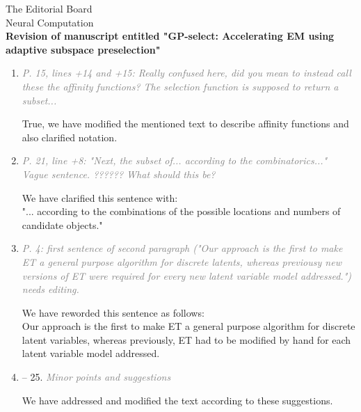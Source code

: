 \documentclass[10pt]{letter}
\newcommand{\rvr}[1]{\textcolor{gray}{#1}}
\newcommand{\pr}{\mathrm{pr}}%
\begin{document}
\begin{letter}{
The Editorial Board\\
Neural Computation\\
\vspace{10mm}
\textbf{Revision of manuscript entitled "GP-select: Accelerating EM using adaptive
subspace preselection"}
}
\begin{enumerate}[topsep=3pt,itemsep=2ex,partopsep=1ex,parsep=1ex]
    Model \textbf{C}. \textit{Nonlinear Spike-and-slab sparse coding}:
    \begin{align}
&\hat{W}_{hd}   = \frac{\langle s_h y_d \rangle^*}{\langle s_d^2 \rangle^*}\ 
\text{\quad}
&\hat{\sigma}^2 = \left\langle W_{dh} s_h - y_d^{(n)}\right\rangle^\ast \nonumber\\
%
&\hat{\pi} = \langle \delta(s) \rangle  \text{\quad}\text{\quad}\text{\quad}\nonumber\\
%
&\hat{\mu}_{\pr} = \langle s_h \rangle^* 
 \text{\quad}\text{\quad}\text{\quad}\text{\quad}\text{\quad}\text{\quad}\text{\quad} 
&\hat{\sigma}^2_{\pr} = \langle (s_h - \hat{\mu}_{\pr})^2 \rangle^* \nonumber
%
\end{align}


    \item \rvr{\emph{P. 15, lines +14 and +15: Really confused here, did you mean to instead call these the affinity functions? The selection function is supposed to return a subset...}}

    True, we have modified the mentioned text to describe affinity functions and also clarified notation. 


    \item \rvr{\emph{P. 21, line +8: "Next, the subset of... according to the combinatorics..." Vague sentence. ??????  What should this be?}}

We have clarified this sentence with:\\
"... according to the combinations of the possible locations and numbers of candidate objects."

    
    \item \rvr{\emph{ P. 4: first sentence of second paragraph ("Our approach is the first to make ET a general purpose algorithm for discrete latents, whereas previousy new versions of ET were required for every new latent variable model addressed.") needs editing.}}

We have reworded this sentence as follows:\\
Our approach is the first to make ET a general purpose algorithm for discrete latent variables, 
 whereas previously, ET had to be modified by hand for each latent variable model addressed. 

    \item -- 25. \rvr{\emph{Minor points and suggestions}}

        We have addressed and modified the text according to these suggestions. 



\end{enumerate}
\end{letter}
\end{document}
